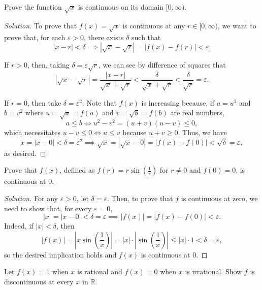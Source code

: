 \documentclass[11pt]{scrartcl}
\providecommand{\eps}{\varepsilon}
\providecommand{\RR}{\mathbb R}
\theoremstyle{problem}
\newenvironment{problem}[1]
{\renewcommand\theinnercustomthm{#1}\innercustomthm}
{\endinnercustomthm}
\theoremstyle{remark}
\newenvironment{soln}{\begin{proof}[Solution]}{\end{proof}}
\providecommand{\abs}[1]{\left|#1\right|}
\begin{document}
\begin{problem}{17.4}
	Prove the function $\sqrt x$ is continuous on its domain $[0,\infty)$.
\end{problem}

\begin{soln}
	To prove that $f(x) = \sqrt x$ is continuous at any $r\in[0,\infty)$,
	we want to prove that, for each $\eps > 0$, there exists $\delta$ such that
	\[|x - r| < \delta \implies |\sqrt x - \sqrt r| = |f(x) - f(r)| < \eps.\]
	
	If $r > 0$, then, taking $\delta = \eps\sqrt r$,
	we can see by difference of squares that
	\[\abs{\sqrt x - \sqrt r} = \frac{\abs{x - r}}{\sqrt x + \sqrt r}
	< \frac{\delta}{\sqrt x + \sqrt r} < \frac{\delta}{\sqrt r} = \eps.\]
	
	If $r = 0$, then take $\delta = \eps^2$.
	Note that $f(x)$ is increasing because, if $a = u^2$ and $b = v^2$
	where $u = \sqrt a = f(a)$ and $v = \sqrt b = f(b)$ are real numbers,
	\[a \le b \iff u^2 - v^2 = (u + v)(u - v) \le 0,\]
	which necessitates $u - v \le 0 \iff u \le v$ because $u + v \ge 0$.
	Thus, we have
	\[x = |x - 0| < \delta = \eps^2 \implies
	\sqrt x = |\sqrt x - 0| = |f(x) - f(0)| < \sqrt\delta = \eps,\]
	as desired.
\end{soln}

\begin{problem}{17.9c}
	Prove that $f(x)$, defined as $f(r) = r\sin(\frac 1r)$ for $r\ne 0$
	and $f(0) = 0$, is continuous at $0$.
\end{problem}

\begin{soln}
	For any $\eps > 0$, let $\delta = \eps$.
	Then, to prove that $f$ is continuous at zero,
	we need to show that, for every $\eps = 0$,
	\[|x| = |x - 0| < \delta = \eps \implies |f(x)| = |f(x) - f(0)| < \eps.\]
	Indeed, if $|x| < \delta$, then
	\[\abs{f(x)} = \abs{x\sin\left(\frac 1x\right)} =
	\abs{x}\cdot\abs{\sin\left(\frac 1x\right)} \le
	\abs x\cdot 1 < \delta = \eps,\]
	so the desired implication holds and $f(x)$ is continuous at $0$.
\end{soln}

\pagebreak
\begin{problem}{17.13a}
	Let $f(x) = 1$ when $x$ is rational and $f(x) = 0$ when $x$ is irrational.
	Show $f$ is discontinuous at every $x$ in $\RR$.
\end{problem}
\end{document}
